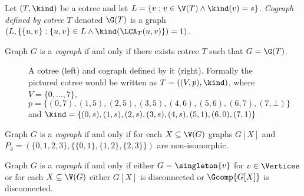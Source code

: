 \begin{defi}\label{codef3}
    Let $(T, \kind)$ be a cotree and let $L = \{v : v \in \V(T) \land \kind(v) = s\}$. \emph{Cograph defined by cotree $T$} denoted $\G(T)$ is a graph $(L, \{\{u,v\} : \{u,v\} \in L \land \kind(\LCA_T(u,v)\}) = 1)$.

    Graph $G$ is a \emph{cograph} if and only if there exists cotree $T$ such that $G = \G(T)$.
\end{defi}

\begin{figure}[h]
    \centering
    \hspace{5em}
    \caption{A cotree (left) and cograph defined by it (right). Formally the pictured cotree would be written as $T = ((V, p), \kind)$, where $V = \{0, \ldots, 7\}$, $p = \{(0, 7), (1,5), (2,5), (3,5), (4,6), (5,6), (6,7), (7,\bot)\}$ and $\kind =\{(0,s), (1,s), (2,s), (3,s), (4,s), (5,1), (6,0), (7,1)\}$}
\end{figure}

\begin{defi}\label{codef4}
    Graph $G$ is a \emph{cograph} if and only if for each $X \subseteq \V(G)$ graphs $G[X]$ and $P_4 = (\{0,1,2,3\}, \{\{0,1\},\{1,2\},\{2,3\}\})$ are non-isomorphic.
\end{defi}

\begin{defi}\label{codef5}
    Graph $G$ is a \emph{cograph} if and only if either $G = \singleton{v}$ for $v \in \Vertices$ or for each $X \subseteq \V(G)$ either $G[X]$ is disconnected or $\Gcomp{G[X]}$ is disconnected.
\end{defi}
